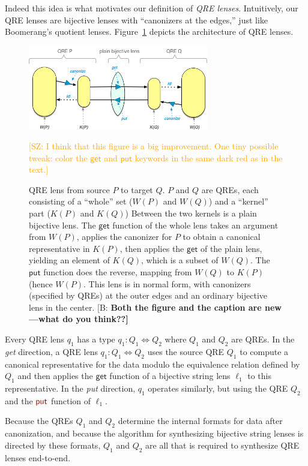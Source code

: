 \documentclass[acmsmall,review,anonymous]{acmart}
\newcommand{\FINISH}[3]{\ifdraft\textcolor{#1}{[#2: #3]}\fi}
\newcommand{\BCP}[1]{\FINISH{dkred}{B}{\bf #1}}
\newcommand{\saz}[1]{\FINISH{orange}{SZ}{#1}}
\newcommand{\kw}[1]{\textcolor{dkred}{\ensuremath{\mathsf{#1}}}}
\newcommand{\lput}{\ensuremath{\kw{put}}}
\begin{document}
Indeed this idea is what motivates our definition of {\em QRE lenses}.
Intuitively, our QRE lenses are bijective lenses with ``canonizers at the edges,''
just like Boomerang's quotient lenses. 
Figure~\ref{fig:attheedges} depicts the architecture of QRE lenses.
\begin{figure}[t]
\centering
\includegraphics[width=0.7\textwidth]{QREs}
\caption{QRE lens from source $P$ to target $Q$.  $P$ and $Q$ are QREs, each
  consisting of a ``whole'' set ($W(P)$ and $W(Q)$) and a ``kernel'' part
  ($K(P)$ and $K(Q)$) Between the two kernels is a plain bijective lens.
  The \kw{get} function of the whole lens takes an argument from $W(P)$,
  applies the canonizer for $P$ to obtain a canonical representative in
  $K(P)$, then applies the \kw{get} of the plain lens, yielding an element
  of $K(Q)$, which is a subset of $W(Q)$.  The \kw{put} function does the
  reverse, mapping from $W(Q)$ to $K(P)$ (hence $W(P)$.  This lens is in
  normal form, with canonizers (specified by QREs) at the outer edges and an
  ordinary bijective lens in the center. \BCP{Both the figure and the
    caption are new---what do you think??}}\saz{I think that this figure is a
  big improvement.  One tiny possible tweak: color the \kw{get} and \kw{put}
  keywords in the same dark red as in the text.}
\label{fig:attheedges}
\end{figure}
Every QRE lens $q_1$ has a type $q_1: Q_1 \Leftrightarrow Q_2$ where $Q_1$ and $Q_2$
are QREs. In the {\em get} direction, a QRE lens $q_1: Q_1 \Leftrightarrow Q_2$ uses the
source QRE $Q_1$ to compute a canonical representative for the data modulo the
equivalence relation defined by $Q_1$ and then applies the \kw{get} function of a
bijective string lens $\ell_1$ to this representative. In the {\em put} direction, $q_1$
operates similarly, but using the QRE $Q_2$ and the $\lput$ function of
$\ell_1$.

Because the QREs $Q_1$ and $Q_2$ determine the internal formats for data after
canonization, and because the algorithm for synthesizing bijective string lenses is
directed by these formats, $Q_1$ and $Q_2$ are all that is required to
synthesize QRE lenses end-to-end. 
\end{document}
